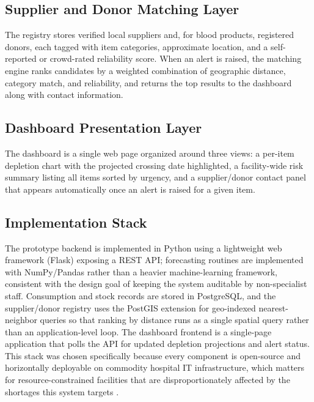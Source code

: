 \documentclass[conference]{IEEEtran}
\begin{document}
\subsection{Supplier and Donor Matching Layer}

The registry stores verified local suppliers and, for blood products, registered donors, each tagged with item categories, approximate location, and a self-reported or crowd-rated reliability score. When an alert is raised, the matching engine ranks candidates by a weighted combination of geographic distance, category match, and reliability, and returns the top results to the dashboard along with contact information.

\subsection{Dashboard Presentation Layer}

The dashboard is a single web page organized around three views: a per-item depletion chart with the projected crossing date highlighted, a facility-wide risk summary listing all items sorted by urgency, and a supplier/donor contact panel that appears automatically once an alert is raised for a given item.

\subsection{Implementation Stack}

The prototype backend is implemented in Python using a lightweight web framework (Flask) exposing a REST API; forecasting routines are implemented with NumPy/Pandas rather than a heavier machine-learning framework, consistent with the design goal of keeping the system auditable by non-specialist staff. Consumption and stock records are stored in PostgreSQL, and the supplier/donor registry uses the PostGIS extension for geo-indexed nearest-neighbor queries so that ranking by distance runs as a single spatial query rather than an application-level loop. The dashboard frontend is a single-page application that polls the API for updated depletion projections and alert status. This stack was chosen specifically because every component is open-source and horizontally deployable on commodity hospital IT infrastructure, which matters for resource-constrained facilities that are disproportionately affected by the shortages this system targets \cite{b3}.

\end{document}
